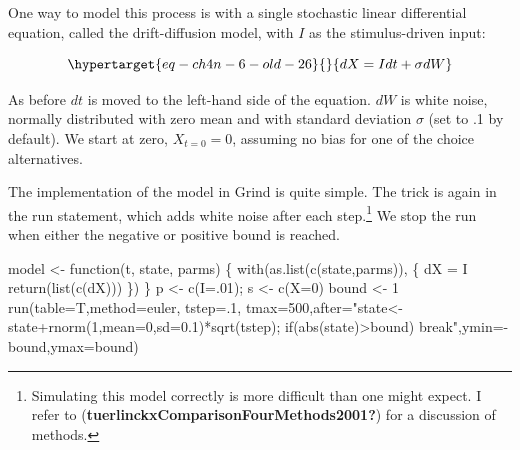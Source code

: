 \documentclass[
  a4paper,
  DIV=11,
  numbers=noendperiod]{scrreprt}
\newenvironment{Shaded}{\begin{snugshade}}{\end{snugshade}}
\newcommand{\AttributeTok}[1]{\textcolor[rgb]{0.40,0.45,0.13}{#1}}
\newcommand{\ControlFlowTok}[1]{\textcolor[rgb]{0.00,0.23,0.31}{#1}}
\newcommand{\DecValTok}[1]{\textcolor[rgb]{0.68,0.00,0.00}{#1}}
\newcommand{\FunctionTok}[1]{\textcolor[rgb]{0.28,0.35,0.67}{#1}}
\newcommand{\NormalTok}[1]{\textcolor[rgb]{0.00,0.23,0.31}{#1}}
\newcommand{\OtherTok}[1]{\textcolor[rgb]{0.00,0.23,0.31}{#1}}
\newcommand{\SpecialCharTok}[1]{\textcolor[rgb]{0.37,0.37,0.37}{#1}}
\newcommand{\StringTok}[1]{\textcolor[rgb]{0.13,0.47,0.30}{#1}}
\begin{document}
One way to model this process is with a single stochastic linear
differential equation, called the drift-diffusion model, with \(I\) as
the stimulus-driven input:

\begin{equation}\protect\hypertarget{eq-ch4n-6-old-26}{}{
dX = Idt + \sigma dW
}\label{eq-ch4n-6-old-26}\end{equation}

As before \(dt\) is moved to the left-hand side of the equation. \(dW\)
is white noise, normally distributed with zero mean and with standard
deviation \(\sigma\) (set to .1 by default). We start at zero,
\(X_{t = 0} = 0\), assuming no bias for one of the choice alternatives.

The implementation of the model in Grind is quite simple. The trick is
again in the run statement, which adds white noise after each
step.\footnote{Simulating this model correctly is more difficult than
  one might expect. I refer to
  (\textbf{tuerlinckxComparisonFourMethods2001?}) for a discussion of
  methods.} We stop the run when either the negative or positive bound
is reached.

\begin{Shaded}
\begin{Highlighting}[]
\NormalTok{model }\OtherTok{\textless{}{-}} \ControlFlowTok{function}\NormalTok{(t, state, parms) \{}
  \FunctionTok{with}\NormalTok{(}\FunctionTok{as.list}\NormalTok{(}\FunctionTok{c}\NormalTok{(state,parms)), \{}
\NormalTok{    dX }\OtherTok{=}\NormalTok{ I}
    \FunctionTok{return}\NormalTok{(}\FunctionTok{list}\NormalTok{(}\FunctionTok{c}\NormalTok{(dX)))}
\NormalTok{  \})}
\NormalTok{\}}
\NormalTok{p }\OtherTok{\textless{}{-}} \FunctionTok{c}\NormalTok{(}\AttributeTok{I=}\NormalTok{.}\DecValTok{01}\NormalTok{); s }\OtherTok{\textless{}{-}} \FunctionTok{c}\NormalTok{(}\AttributeTok{X=}\DecValTok{0}\NormalTok{)}
\NormalTok{bound }\OtherTok{\textless{}{-}} \DecValTok{1}
\FunctionTok{run}\NormalTok{(}\AttributeTok{table=}\NormalTok{T,}\AttributeTok{method=}\StringTok{\textquotesingle{}euler\textquotesingle{}}\NormalTok{, }\AttributeTok{tstep=}\NormalTok{.}\DecValTok{1}\NormalTok{,}
    \AttributeTok{tmax=}\DecValTok{500}\NormalTok{,}\AttributeTok{after=}\StringTok{"state\textless{}{-}state+rnorm(1,mean=0,sd=0.1)*sqrt(tstep);}
\StringTok{    if(abs(state)\textgreater{}bound) break"}\NormalTok{,}\AttributeTok{ymin=}\SpecialCharTok{{-}}\NormalTok{bound,}\AttributeTok{ymax=}\NormalTok{bound)}
\end{Highlighting}
\end{Shaded}
\end{document}
